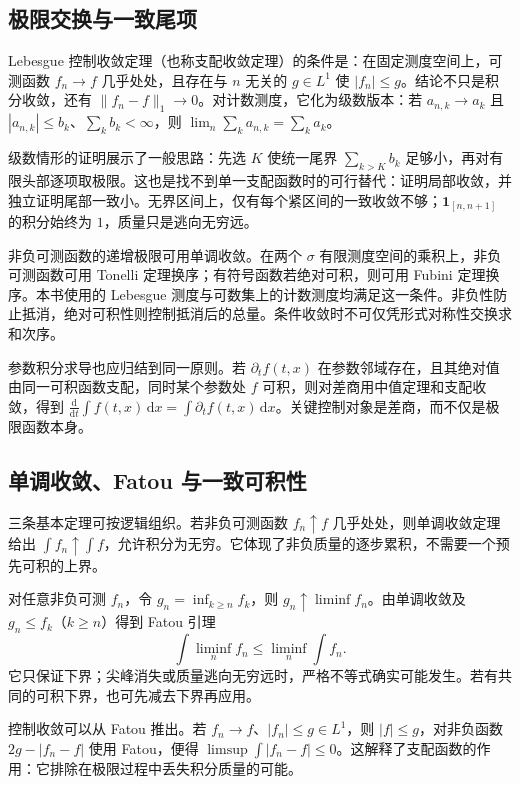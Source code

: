 \documentclass[UTF8,12pt,a4paper,fontset=fandol]{ctexart}
\begin{document}
\subsection{极限交换与一致尾项}

\label{app:integration-exchange}

Lebesgue 控制收敛定理（也称支配收敛定理）的条件是：在固定测度空间上，可测函数 $f_n\to f$ 几乎处处，且存在与 $n$ 无关的 $g\in L^1$ 使 $|f_n|\leq g$。结论不只是积分收敛，还有 $\|f_n-f\|_1\to0$。对计数测度，它化为级数版本：若 $a_{n,k}\to a_k$ 且 $|a_{n,k}|\leq b_k$、$\sum_kb_k<\infty$，则 $\lim_n\sum_ka_{n,k}=\sum_ka_k$。

级数情形的证明展示了一般思路：先选 $K$ 使统一尾界 $\sum_{k>K}b_k$ 足够小，再对有限头部逐项取极限。这也是找不到单一支配函数时的可行替代：证明局部收敛，并独立证明尾部一致小。无界区间上，仅有每个紧区间的一致收敛不够；$\mathbf1_{[n,n+1]}$ 的积分始终为 $1$，质量只是逃向无穷远。

非负可测函数的递增极限可用单调收敛。在两个 $\sigma$ 有限测度空间的乘积上，非负可测函数可用 Tonelli 定理换序；有符号函数若绝对可积，则可用 Fubini 定理换序。本书使用的 Lebesgue 测度与可数集上的计数测度均满足这一条件。非负性防止抵消，绝对可积性则控制抵消后的总量。条件收敛时不可仅凭形式对称性交换求和次序。

参数积分求导也应归结到同一原则。若 $\partial_tf(t,x)$ 在参数邻域存在，且其绝对值由同一可积函数支配，同时某个参数处 $f$ 可积，则对差商用中值定理和支配收敛，得到 $\frac{\mathrm d}{\mathrm dt}\int f(t,x)\,\mathrm dx=\int\partial_tf(t,x)\,\mathrm dx$。关键控制对象是差商，而不仅是极限函数本身。

\subsection{单调收敛、Fatou 与一致可积性}

\label{app:integration-fatou}

三条基本定理可按逻辑组织。若非负可测函数 $f_n\uparrow f$ 几乎处处，则单调收敛定理给出 $\int f_n\uparrow\int f$，允许积分为无穷。它体现了非负质量的逐步累积，不需要一个预先可积的上界。

对任意非负可测 $f_n$，令 $g_n=\inf_{k\geq n}f_k$，则 $g_n\uparrow\liminf f_n$。由单调收敛及 $g_n\leq f_k$（$k\geq n$）得到 Fatou 引理
\[
\int\liminf_nf_n\leq\liminf_n\int f_n.
\]
它只保证下界；尖峰消失或质量逃向无穷远时，严格不等式确实可能发生。若有共同的可积下界，也可先减去下界再应用。

控制收敛可以从 Fatou 推出。若 $f_n\to f$、$|f_n|\leq g\in L^1$，则 $|f|\leq g$，对非负函数 $2g-|f_n-f|$ 使用 Fatou，便得 $\limsup\int|f_n-f|\leq0$。这解释了支配函数的作用：它排除在极限过程中丢失积分质量的可能。
\end{document}
